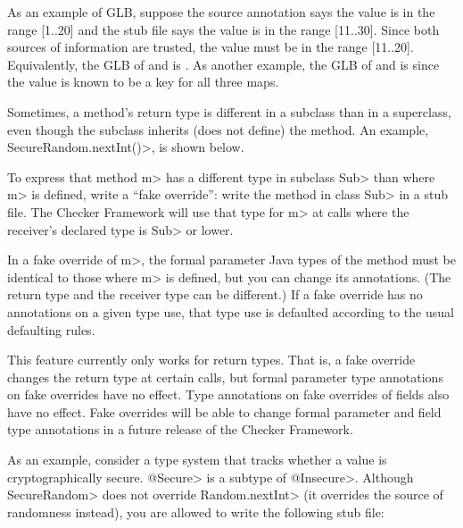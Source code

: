 As an example of GLB, suppose the source annotation says the value is in
the range [1..20] and the stub file says the value is in the range
[11..30].  Since both sources of information are trusted, the value must be
in the range [11..20].  Equivalently, the GLB of
 and
 is
.
As another example, the GLB of
 and
 is
since the value is known to be a key for all three maps.



Sometimes, a method's return type is different in a subclass than in a
superclass, even though the subclass inherits (does not define) the method.
An example, \<SecureRandom.nextInt()>, is shown below.

To express that method \<m> has a different type in subclass \<Sub> than
where \<m> is defined, write a ``fake override'':  write the method in
class \<Sub> in a stub file.  The Checker Framework will use that type for
\<m> at calls where the receiver's declared type is \<Sub> or lower.

In a fake override of \<m>, the formal parameter Java types of the method
must be identical to those where \<m> is defined, but you can change its
annotations.  (The return type and the receiver type can be different.)
If a fake override has no annotations on a given type use, that type use is
defaulted according to the usual defaulting rules.

This feature currently only works for return types.  That is, a fake
override changes the return type at certain calls, but formal parameter
type annotations on fake overrides have no effect.  Type annotations on
fake overrides of fields also have no effect.  Fake overrides will be able
to change formal parameter and field type annotations in a future release
of the Checker Framework.



As an example, consider a type system that tracks whether a value is
cryptographically secure.  \<@Secure> is a subtype of \<@Insecure>.
Although \<SecureRandom> does not override \<Random.nextInt> (it overrides
the source of randomness instead), you are allowed to write the following
stub file:

